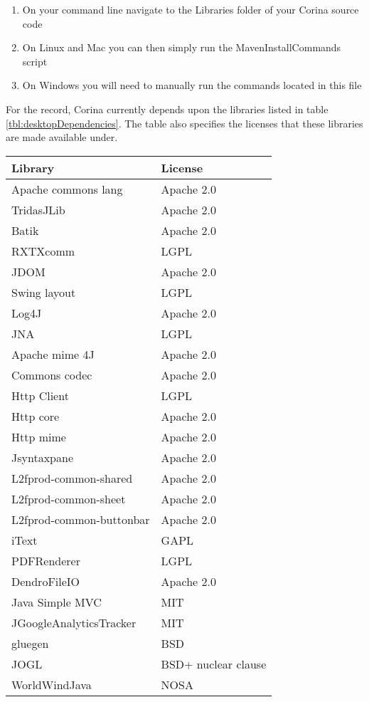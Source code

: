 \begin{enumerate}
 \item On your command line navigate to the Libraries folder of your Corina source code
 \item On Linux and Mac you can then simply run the MavenInstallCommands script
 \item On Windows you will need to manually run the commands located in this file
\end{enumerate}

For the record, Corina currently depends upon the libraries listed in table \ref{tbl:desktopDependencies}.  The table also specifies the licenses that these libraries are made available under.


\begin{table*}[htbp]
\centering
{}
\begin{tabular*}{0.6\textwidth}{ll}
\toprule
Library & License \\
\midrule
Apache commons lang & Apache 2.0 \\
TridasJLib & Apache 2.0 \\
Batik & Apache 2.0 \\ 
RXTXcomm & LGPL\\
JDOM & Apache 2.0\\
Swing layout & LGPL\\
Log4J & Apache 2.0\\
JNA & LGPL\\
Apache mime 4J & Apache 2.0\\
Commons codec & Apache 2.0\\
Http Client &LGPL\\
Http core & Apache 2.0\\
Http mime &Apache 2.0\\
Jsyntaxpane & Apache 2.0\\
L2fprod-common-shared &Apache 2.0\\
L2fprod-common-sheet &Apache 2.0\\
L2fprod-common-buttonbar &Apache 2.0\\
iText &GAPL\\
PDFRenderer & LGPL\\
DendroFileIO & Apache 2.0\\
Java Simple MVC & MIT\\
JGoogleAnalyticsTracker & MIT\\
gluegen & BSD\\
JOGL & BSD+ nuclear clause\\
WorldWindJava & NOSA \\

\end{tabular*}
\end{table*}

